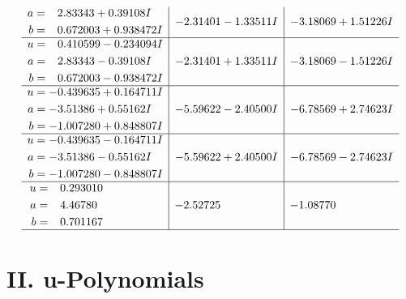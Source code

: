 \documentclass[1p]{elsarticle_modified}
\theoremstyle{definition}
\begin{document}
$$\begin{array}{c|c|c}
\begin{aligned}
a &= \phantom{-}2.83343 + 0.39108 I \\
b &= \phantom{-}0.672003 + 0.938472 I\end{aligned}
 & -2.31401 - 1.33511 I & -3.18069 + 1.51226 I \\ \hline\begin{aligned}
u &= \phantom{-}0.410599 - 0.234094 I \\
a &= \phantom{-}2.83343 - 0.39108 I \\
b &= \phantom{-}0.672003 - 0.938472 I\end{aligned}
 & -2.31401 + 1.33511 I & -3.18069 - 1.51226 I \\ \hline\begin{aligned}
u &= -0.439635 + 0.164711 I \\
a &= -3.51386 + 0.55162 I \\
b &= -1.007280 + 0.848807 I\end{aligned}
 & -5.59622 - 2.40500 I & -6.78569 + 2.74623 I \\ \hline\begin{aligned}
u &= -0.439635 - 0.164711 I \\
a &= -3.51386 - 0.55162 I \\
b &= -1.007280 - 0.848807 I\end{aligned}
 & -5.59622 + 2.40500 I & -6.78569 - 2.74623 I \\ \hline\begin{aligned}
u &= \phantom{-}0.293010\phantom{ +0.000000I} \\
a &= \phantom{-}4.46780\phantom{ +0.000000I} \\
b &= \phantom{-}0.701167\phantom{ +0.000000I}\end{aligned}
 & -2.52725\phantom{ +0.000000I} & -1.08770\phantom{ +0.000000I}\\
 \hline 
 \end{array}$$\newpage
\newpage\renewcommand{\arraystretch}{1}
\centering \section*{ II. u-Polynomials}
\end{document}
